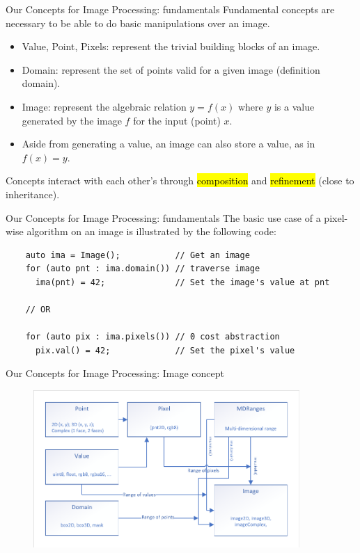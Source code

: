 \documentclass[12pt,aspectratio=169]{beamer}
\makeatletter
\let\HL\hl
\renewcommand\hl{%
  \let\set@color\beamerorig@set@color
  \let\reset@color\beamerorig@reset@color
  \HL}
\makeatother
\begin{document}
\begin{frame}[fragile]{Our Concepts for Image Processing: fundamentals}
  Fundamental concepts are necessary to be able to do basic manipulations over an image.
  \begin{itemize}
    \item Value, Point, Pixels: represent the trivial building blocks of an image.
    \item Domain: represent the set of points valid for a given image (definition domain).
    \item Image: represent the algebraic relation \(y = f(x)\) where \(y\) is a value generated by the image \(f\) for
          the input (point) \(x\).
    \item Aside from generating a value, an image can also store a value, as in \(f(x) = y\).
  \end{itemize}
  Concepts interact with each other's through \hl{composition} and \hl{refinement} (close to inheritance).
\end{frame}

\begin{frame}[fragile]{Our Concepts for Image Processing: fundamentals}
  The basic use case of a pixel-wise algorithm on an image is illustrated by the following code:
  \begin{verbatim}
    auto ima = Image();           // Get an image
    for (auto pnt : ima.domain()) // traverse image
      ima(pnt) = 42;              // Set the image's value at pnt
    
    // OR

    for (auto pix : ima.pixels()) // 0 cost abstraction
      pix.val() = 42;             // Set the pixel's value
  \end{verbatim}
\end{frame}

\begin{frame}[fragile]{Our Concepts for Image Processing: Image concept}
  \centering
  \begin{figure}
    \includegraphics[width=0.9\textwidth]{../figures/concepts/image}
  \end{figure}
\end{frame}
\end{document}
